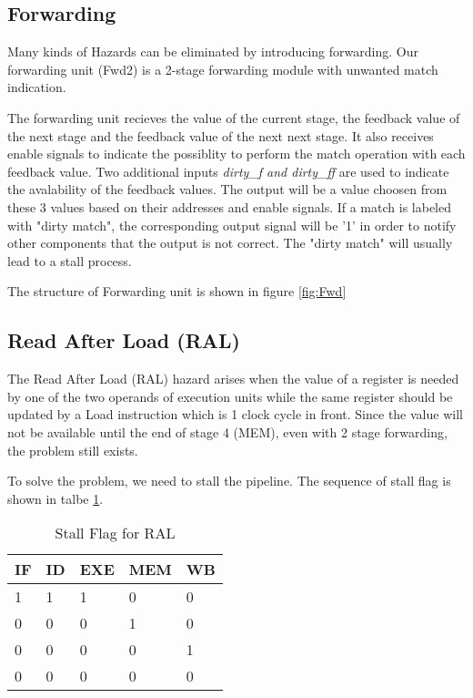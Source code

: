 \subsection[Forwarding]{Forwarding}
Many kinds of Hazards can be eliminated by introducing forwarding. Our forwarding
unit (Fwd2) is a 2-stage forwarding module with unwanted match indication.

The forwarding unit recieves the value of the current stage, the feedback value
of the next stage and the feedback value of the next next stage. It also receives
enable signals to indicate the possiblity to perform the match operation with each
feedback value. Two additional inputs {\it dirty\_f and dirty\_ff} are used to
indicate the avalability of the feedback values. The output will be a value choosen from these
3 values based on their addresses and enable signals. If a match is labeled with
"dirty match", the corresponding output signal will be '1' in order to notify other
components that the output is not correct. The "dirty match" will usually lead to
a stall process.

The structure of Forwarding unit is shown in figure \ref{fig:Fwd}

\subsection[Read After Load (RAL)]{Read After Load (RAL)}
The Read After Load (RAL) hazard arises when the value of a register is needed by
one of the two operands of execution units while the same register should be
updated by a Load instruction which is 1 clock cycle
in front. Since the value will not be available until the end of stage 4 (MEM), even
with 2 stage forwarding, the problem still exists.

To solve the problem, we need to stall the pipeline. The sequence of stall flag
is shown in talbe \ref{tab:stall_ral}.

\begin{table}[!ht]
\centering
\caption{Stall Flag for RAL}
\label{tab:stall_ral}
\begin{tabular}{|l|l|l|l|l|}
\hline
IF & ID & EXE & MEM & WB \\
\hline
1  & 1  & 1  & 0  & 0\\
0  & 0  & 0  & 1  & 0\\
0  & 0  & 0  & 0  & 1\\
0  & 0  & 0  & 0  & 0 \\
\hline
\end{tabular}
\end{table}

